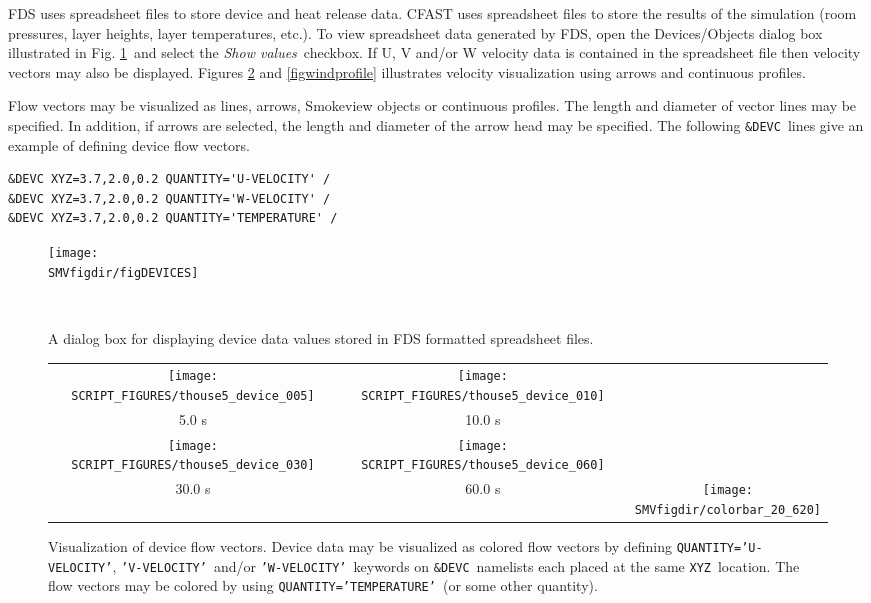 \documentclass[11pt,twoside]{book}
\newcommand{\figheightAbar}{2.2in}
\begin{document}
FDS uses spreadsheet files to store device and heat release data.
CFAST uses spreadsheet files to store the results of the
simulation (room pressures, layer heights, layer temperatures,
etc.). To view spreadsheet data generated by FDS, open the
Devices/Objects dialog box illustrated in Fig.
\ref{figDEVICES}\ and select the {\em Show values}\ checkbox. If U,
V and/or W velocity data is contained in the spreadsheet file then
velocity vectors may also be displayed. Figures \ref{figdevicevectors} and
\ref{figwindprofile} illustrates velocity visualization using arrows and continuous profiles.


Flow vectors may be visualized as lines, arrows, Smokeview objects or continuous profiles.  The length
and diameter of vector lines may be specified.  In addition, if arrows are selected, the length and diameter of the arrow head may be specified.
The following {\tt \&DEVC}\ lines give an example of defining device flow vectors.

\begin{verbatim}
&DEVC XYZ=3.7,2.0,0.2 QUANTITY='U-VELOCITY' /
&DEVC XYZ=3.7,2.0,0.2 QUANTITY='W-VELOCITY' /
&DEVC XYZ=3.7,2.0,0.2 QUANTITY='TEMPERATURE' /
\end{verbatim}


\begin{figure}[bph]
\begin{center}
\texttt{[image: \\SMVfigdir/figDEVICES]}
\end{center}
\caption{A dialog box for displaying device data values stored in
FDS formatted spreadsheet files.}\ \label{figDEVICES}
\end{figure}


\begin{figure}[bph]
\begin{center}
\begin{tabular}{ccc}
\texttt{[image: SCRIPT\_FIGURES/thouse5\_device\_005]}&
\texttt{[image: SCRIPT\_FIGURES/thouse5\_device\_010]}\\
5.0 s&10.0 s\\
\texttt{[image: SCRIPT\_FIGURES/thouse5\_device\_030]}&
\texttt{[image: SCRIPT\_FIGURES/thouse5\_device\_060]}&\\
30.0 s&60.0 s
&\raisebox{0.0ex}[0pt]{\texttt{[image: \\SMVfigdir/colorbar\_20\_620]}}\\
\end{tabular}
\caption [Visualization of device flow vectors.]
{Visualization of device flow vectors.
Device data may be visualized as colored flow vectors by defining {\tt QUANTITY='U-VELOCITY'},
{\tt 'V-VELOCITY'}\ and/or
{\tt 'W-VELOCITY'}\ keywords
on {\tt \&DEVC}\ namelists each placed at the same {\tt XYZ}\ location.
The flow vectors may be colored by
using {\tt QUANTITY='TEMPERATURE'}\ (or some other quantity).
}
\label{figdevicevectors}%
\end{center}
\end{figure}
\end{document}
